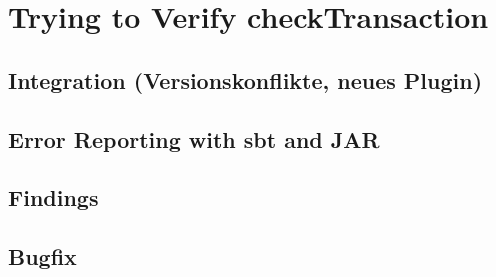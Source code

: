 \chapter{Trying to Verify checkTransaction}
\label{chap:connecting}

\section{Integration (Versionskonflikte, neues Plugin)}


\section{Error Reporting with sbt and JAR}


\section{Findings}


\section{Bugfix}

